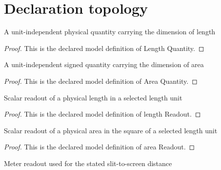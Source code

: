 \section{Declaration topology}
\begin{definition}
  \label{def:physics:phyx-mini-0119:phyxminiproblems-problemphyxmini0119-lengthquantity}
  A unit-independent physical quantity carrying the dimension of length
\end{definition}
\begin{proof}
  This is the declared model definition of Length Quantity.
\end{proof}
\begin{definition}
  \label{def:physics:phyx-mini-0119:phyxminiproblems-problemphyxmini0119-areaquantity}
  A unit-independent signed quantity carrying the dimension of area
\end{definition}
\begin{proof}
  This is the declared model definition of Area Quantity.
\end{proof}
\begin{definition}
  \label{def:physics:phyx-mini-0119:phyxminiproblems-problemphyxmini0119-lengthreadout}
  Scalar readout of a physical length in a selected length unit
\end{definition}
\begin{proof}
  This is the declared model definition of length Readout.
\end{proof}
\begin{definition}
  \label{def:physics:phyx-mini-0119:phyxminiproblems-problemphyxmini0119-areareadout}
  Scalar readout of a physical area in the square of a selected length unit
\end{definition}
\begin{proof}
  This is the declared model definition of area Readout.
\end{proof}
\begin{definition}
  \label{def:physics:phyx-mini-0119:phyxminiproblems-problemphyxmini0119-lengthinmeters}
  Meter readout used for the stated slit-to-screen distance
\end{definition}
